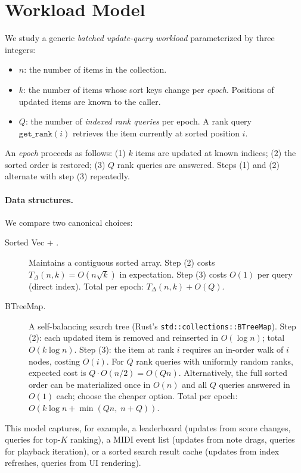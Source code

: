 \section{Workload Model}
\label{sec:model}

We study a generic \emph{batched update-query workload} parameterized by three integers:

\begin{itemize}
  \item $n$: the number of items in the collection.
  \item $k$: the number of items whose sort keys change per \emph{epoch}.
    Positions of updated items are known to the caller.
  \item $Q$: the number of \emph{indexed rank queries} per epoch.
    A rank query $\texttt{get\_rank}(i)$ retrieves the item currently at
    sorted position $i$.
\end{itemize}

An \emph{epoch} proceeds as follows: (1) $k$ items are updated at known indices;
(2) the sorted order is restored; (3) $Q$ rank queries are answered.
Steps (1) and (2) alternate with step (3) repeatedly.

\paragraph{Data structures.}
We compare two canonical choices:

\begin{description}
  \item[Sorted Vec + \DeltaSort.]
    Maintains a contiguous sorted array.
    Step (2) costs $T_{\Delta}(n,k) = O(n\sqrt{k})$ in expectation.
    Step (3) costs $O(1)$ per query (direct index).
    Total per epoch: $T_{\Delta}(n,k) + O(Q)$.

  \item[BTreeMap.]
    A self-balancing search tree (Rust's \texttt{std::collections::BTreeMap}).
    Step (2): each updated item is removed and reinserted in $O(\log n)$;
    total $O(k \log n)$.
    Step (3): the item at rank $i$ requires an in-order walk of $i$ nodes,
    costing $O(i)$.
    For $Q$ rank queries with uniformly random ranks, expected cost is
    $Q \cdot O(n/2) = O(Qn)$.
    Alternatively, the full sorted order can be materialized once in $O(n)$
    and all $Q$ queries answered in $O(1)$ each; choose the cheaper option.
    Total per epoch: $O(k \log n + \min(Qn,\; n + Q))$.
\end{description}

This model captures, for example, a leaderboard (updates from score changes,
queries for top-$K$ ranking), a MIDI event list (updates from note drags,
queries for playback iteration), or a sorted search result cache (updates
from index refreshes, queries from UI rendering).
